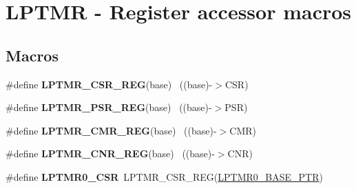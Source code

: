 \hypertarget{group___l_p_t_m_r___register___accessor___macros}{}\section{L\+P\+T\+M\+R -\/ Register accessor macros}
\label{group___l_p_t_m_r___register___accessor___macros}
\subsection*{Macros}
\begin{DoxyCompactItemize}
\item 
\hypertarget{group___l_p_t_m_r___register___accessor___macros_ga10321db77b5ec14e5985fe94395f437d}{}\#define {\bfseries L\+P\+T\+M\+R\+\_\+\+C\+S\+R\+\_\+\+R\+E\+G}(base)                                        ~((base)-\/$>$C\+S\+R)\label{group___l_p_t_m_r___register___accessor___macros_ga10321db77b5ec14e5985fe94395f437d}

\item 
\hypertarget{group___l_p_t_m_r___register___accessor___macros_gaecd9b9ac7bad67f904628f9ecc653285}{}\#define {\bfseries L\+P\+T\+M\+R\+\_\+\+P\+S\+R\+\_\+\+R\+E\+G}(base)                                        ~((base)-\/$>$P\+S\+R)\label{group___l_p_t_m_r___register___accessor___macros_gaecd9b9ac7bad67f904628f9ecc653285}

\item 
\hypertarget{group___l_p_t_m_r___register___accessor___macros_ga7a7ca80913d5f4e2ceed4be05272267a}{}\#define {\bfseries L\+P\+T\+M\+R\+\_\+\+C\+M\+R\+\_\+\+R\+E\+G}(base)                                        ~((base)-\/$>$C\+M\+R)\label{group___l_p_t_m_r___register___accessor___macros_ga7a7ca80913d5f4e2ceed4be05272267a}

\item 
\hypertarget{group___l_p_t_m_r___register___accessor___macros_gac2f4b2b992990404896f3b23f4d666cb}{}\#define {\bfseries L\+P\+T\+M\+R\+\_\+\+C\+N\+R\+\_\+\+R\+E\+G}(base)                                        ~((base)-\/$>$C\+N\+R)\label{group___l_p_t_m_r___register___accessor___macros_gac2f4b2b992990404896f3b23f4d666cb}

\item 
\hypertarget{group___l_p_t_m_r___register___accessor___macros_ga92117617fde3b4150e2c04e6f828f565}{}\#define {\bfseries L\+P\+T\+M\+R0\+\_\+\+C\+S\+R}~L\+P\+T\+M\+R\+\_\+\+C\+S\+R\+\_\+\+R\+E\+G(\hyperlink{group___l_p_t_m_r___peripheral_ga90a9194151ad11b422bcab162e797eda}{L\+P\+T\+M\+R0\+\_\+\+B\+A\+S\+E\+\_\+\+P\+T\+R})\label{group___l_p_t_m_r___register___accessor___macros_ga92117617fde3b4150e2c04e6f828f565}


\end{DoxyCompactItemize}

